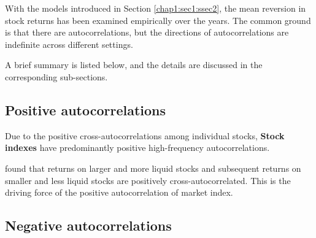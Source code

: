 With the models introduced in Section \ref{chap1:sec1:ssec2}, the mean reversion in stock returns
has been examined empirically over the years. The common ground is that there are autocorrelations,
but the directions of autocorrelations are indefinite across different settings.

A brief summary is listed below, and the details are discussed in the corresponding sub-sections.

\subsection{Positive autocorrelations}
Due to the positive cross-autocorrelations among individual stocks, \textbf{Stock indexes} have predominantly
positive high-frequency autocorrelations.

\citet{lo1988stock,lo1990contrarian} found that returns on larger and more liquid stocks and subsequent
returns on smaller and less liquid stocks are positively cross-autocorrelated. This is the driving force of 
the positive autocorrelation of market index. 


\subsection{Negative autocorrelations}

